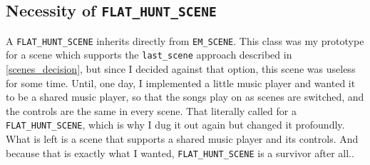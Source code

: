 \subsection{Necessity of \texttt{FLAT\_HUNT\_SCENE}}
A \texttt{FLAT\_HUNT\_SCENE} inherits directly from \texttt{EM\_SCENE}. This class was my prototype for a scene which supports the \texttt{last\_scene} approach described in \autoref{scenes_decision}, but since I decided against that option, this scene was useless for some time. Until, one day, I implemented a little music player and wanted it to be a shared music player, so that the songs play on as scenes are switched, and the controls are the same in every scene. That literally called for a \texttt{FLAT\_HUNT\_SCENE}, which is why I dug it out again but changed it profoundly. What is left is a scene that supports a shared music player and its controls. And because that is exactly what I wanted, \texttt{FLAT\_HUNT\_SCENE} is a survivor after all..

